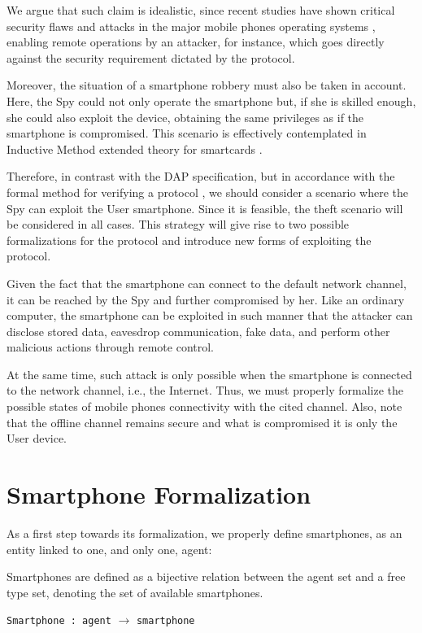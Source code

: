 We argue that such claim is idealistic, since recent studies have shown critical security flaws and attacks in the major mobile phones operating systems \cite{ZhouJiang2012,Han2013}, enabling remote operations by an attacker, for instance, which goes directly against the security requirement dictated by the protocol. 

Moreover, the situation of a smartphone robbery must also be taken in account. Here, the Spy could not only operate the smartphone but, if she is skilled enough, she could also exploit the device, obtaining the same privileges as if the smartphone is compromised. This scenario is effectively contemplated in Inductive Method extended theory for smartcards \cite[Ch. 10]{Bella2007}.

Therefore, in contrast with the DAP specification, but in accordance with the formal method for verifying a protocol \cite[Ch. 11]{Bella2007}, we should consider a scenario where the Spy can exploit the User smartphone. Since it is feasible, the theft scenario will be considered in all cases. This strategy will give rise to two possible formalizations for the protocol and introduce new forms of exploiting the protocol. 

Given the fact that the smartphone can connect to the default network channel, it can be reached by the Spy and further compromised by her. Like an ordinary computer, the smartphone can be exploited in such manner that the attacker can disclose stored data, eavesdrop communication, fake data, and perform other malicious actions through remote control.

At the same time, such attack is only possible when the smartphone is connected to the network channel, i.e., the Internet. Thus, we must properly formalize the possible states of mobile phones connectivity with the cited channel. Also, note that the offline channel remains secure and what is compromised it is only the User device.


\section{Smartphone Formalization}
As a first step towards its formalization, we properly define smartphones, as an entity linked to one, and only one, agent:

\begin{definition}
  Smartphones are defined as a bijective relation between the agent set and a free type set, denoting the set of available smartphones.
  \begin{center}
    \texttt{Smartphone : agent} $\longrightarrow$ \texttt{smartphone}
  \end{center}
\end{definition}

